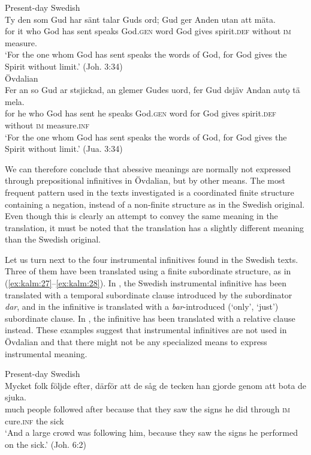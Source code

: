 \documentclass[output=paper]{langscibook}
\begin{document}
\ea
\label{ex:kalm:26}
\ea Present-day Swedish\label{ex:kalm:26a}\\
\gll Ty den som Gud har sänt talar Guds ord; Gud ger Anden utan att mäta.\\
for it who God has sent speaks God.\textsc{gen} word God gives spirit.\textsc{def} without \textsc{im} measure.\\
\glt ‘For the one whom God has sent speaks the words of God, for God gives the Spirit without limit.’ (Joh. 3:34)\\

\ex Övdalian\label{ex:kalm:26b}\\
\gll Fer an so Gud ar stsjickad, an glemer Gudes uord, fer Gud dsjäv Andan autǫ tä mela.\\
for he who God has sent he speaks God.\textsc{gen} word for God gives spirit.\textsc{def} without \textsc{im} measure.\textsc{inf}\\
\glt ‘For the one whom God has sent speaks the words of God, for God gives the Spirit without limit.’ (Jua. 3:34)
\z
\z 


We can therefore conclude that abessive meanings are normally not expressed through prepositional infinitives in Övdalian, but by other means. The most frequent pattern used in the texts investigated is a coordinated finite structure containing a negation, instead of a non-finite structure as in the Swedish original. Even though this is clearly an attempt to convey the same meaning in the translation, it must be noted that the translation has a slightly different meaning than the Swedish original. 



Let us turn next to the four instrumental infinitives found in the Swedish texts. Three of them have been translated using a finite subordinate structure, as in (\ref{ex:kalm:27}–\ref{ex:kalm:28}). In , the Swedish instrumental infinitive has been translated with a temporal subordinate clause introduced by the subordinator \textit{dar}, and in  the infinitive is translated with a \textit{bar}-introduced (‘only’, ‘just’) subordinate clause. In , the infinitive has been translated with a relative clause instead. These examples suggest that instrumental infinitives are not used in Övdalian and that there might not be any specialized means to express instrumental meaning. 


\ea
\label{ex:kalm:27}
\ea Present-day Swedish\label{ex:kalm:27a}\\
\gll Mycket folk följde efter, därför att de såg de tecken han gjorde genom att bota de sjuka.\\
 much people followed after because that they saw the signs he did through \textsc{im} cure.\textsc{inf} the sick\\
\glt ‘And a large crowd was following him, because they saw the signs he performed on the sick.’ (Joh. 6:2)\\
\end{document}
